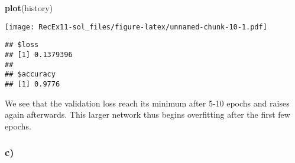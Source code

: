 \documentclass[]{article}
\newenvironment{Shaded}{\begin{snugshade}}{\end{snugshade}}
\newcommand{\KeywordTok}[1]{\textcolor[rgb]{0.13,0.29,0.53}{\textbf{#1}}}
\newcommand{\NormalTok}[1]{#1}
\newcommand{\OperatorTok}[1]{\textcolor[rgb]{0.81,0.36,0.00}{\textbf{#1}}}
\newcommand{\StringTok}[1]{\textcolor[rgb]{0.31,0.60,0.02}{#1}}
\begin{document}
\begin{Shaded}
\begin{Highlighting}[]
\KeywordTok{plot}\NormalTok{(history)}
\end{Highlighting}
\end{Shaded}

\texttt{[image: RecEx11-sol\_files/figure-latex/unnamed-chunk-10-1.pdf]}

\begin{Shaded}
\end{Shaded}

\begin{verbatim}
## $loss
## [1] 0.1379396
## 
## $accuracy
## [1] 0.9776
\end{verbatim}

We see that the validation loss reach its minimum after 5-10 epochs and
raises again afterwards. This larger network thus begins overfitting
after the first few epochs.

\hypertarget{c-2}{%
\subsubsection{c)}\label{c-2}}
\end{document}
